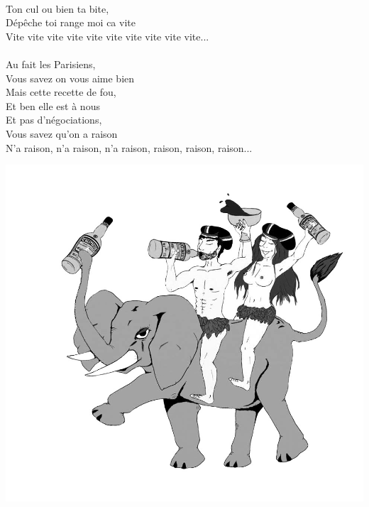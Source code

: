 \\Ton cul ou bien ta bite, 
\\Dépêche toi range moi ca vite
\\Vite vite vite vite vite vite vite vite vite vite...
\\\\Au fait les Parisiens, 
\\Vous savez on vous aime bien
\\Mais cette recette de fou, 
\\Et ben elle est à nous
\\Et pas d'négociations, 
\\Vous savez qu'on a raison
\\N'a raison, n'a raison, n'a raison, raison, raison, raison...
\begin{center}
\includegraphics[width=1\textwidth]{images/chartreuse2.jpg}
\end{center}

\breakpage